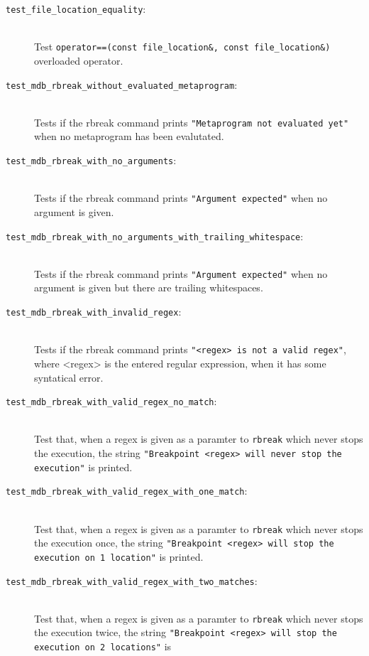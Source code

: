 \begin{description}
    \item[\texttt{test\_file\_location\_equality}:] \hfill \\
        Test \texttt{operator==(const file\_location\&, const file\_location\&)}
        overloaded operator.
    \item[\texttt{test\_mdb\_rbreak\_without\_evaluated\_metaprogram}:] \hfill \\
        Tests if the rbreak command prints
        \texttt{"Metaprogram not evaluated yet"} when no metaprogram has been
        evalutated.
    \item[\texttt{test\_mdb\_rbreak\_with\_no\_arguments}:] \hfill \\
        Tests if the rbreak command prints
        \texttt{"Argument expected"} when no argument is given.
    \item[\texttt{test\_mdb\_rbreak\_with\_no\_arguments\_with\_trailing\_whitespace}:] \hfill \\
        Tests if the rbreak command prints
        \texttt{"Argument expected"} when no argument is given but there are
        trailing whitespaces.
    \item[\texttt{test\_mdb\_rbreak\_with\_invalid\_regex}:] \hfill \\
        Tests if the rbreak command prints
        \texttt{"<regex> is not a valid regex"}, where <regex> is the entered
        regular expression, when it has some syntatical error.
    \item[\texttt{test\_mdb\_rbreak\_with\_valid\_regex\_no\_match}:] \hfill \\
        Test that, when a regex is given as a paramter to \texttt{rbreak} which
        never stops the execution, the string
        \texttt{"Breakpoint <regex> will never stop the execution"} is
        printed.
    \item[\texttt{test\_mdb\_rbreak\_with\_valid\_regex\_with\_one\_match}:] \hfill \\
        Test that, when a regex is given as a paramter to \texttt{rbreak} which
        never stops the execution once, the string
        \texttt{"Breakpoint <regex> will stop the execution on 1 location"} is
        printed.
    \item[\texttt{test\_mdb\_rbreak\_with\_valid\_regex\_with\_two\_matches}:] \hfill \\
        Test that, when a regex is given as a paramter to \texttt{rbreak} which
        never stops the execution twice, the string
        \texttt{"Breakpoint <regex> will stop the execution on 2 locations"} is

\end{description}
